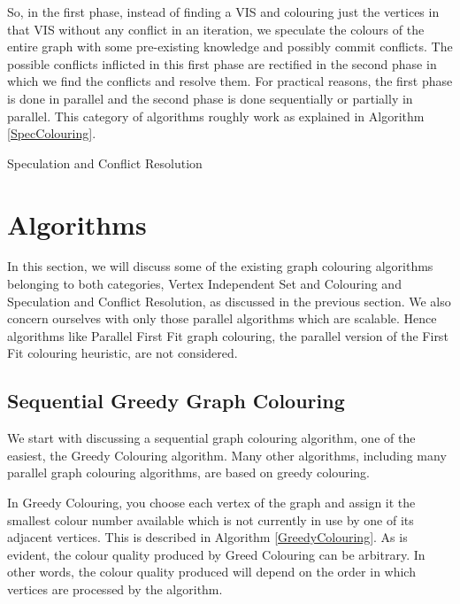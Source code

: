 \documentclass[MTech]{iitmdiss}
\makeatletter
\def\BState{\State\hskip-\ALG@thistlm}
\makeatother
\begin{document}
So, in the first phase, instead of finding a VIS and colouring just the vertices in that VIS without any conflict in an iteration, we speculate the colours of the entire graph with some pre-existing knowledge and possibly commit conflicts. The possible conflicts inflicted in this first phase are rectified in the second phase in which we find the conflicts and resolve them. For practical reasons, the first phase is done in parallel and the second phase is done sequentially or partially in parallel. This category of algorithms roughly work as explained in Algorithm \ref{SpecColouring}.

\begin{algorithm}
\caption{Speculation and Conflict Resolution}\label{SpecColouring}
\end{algorithm}
\section{Algorithms}
In this section, we will discuss some of the existing graph colouring algorithms belonging to both categories, Vertex Independent Set and Colouring and Speculation and Conflict Resolution, as discussed in the previous section. We also concern ourselves with only those parallel algorithms which are scalable. Hence algorithms like Parallel First Fit graph colouring, the parallel version of the First Fit colouring heuristic, are not considered. 
\subsection{Sequential Greedy Graph Colouring}
We start with discussing a sequential graph colouring algorithm, one of the easiest, the Greedy Colouring algorithm. Many other algorithms, including many parallel graph colouring algorithms, are based on greedy colouring.

In Greedy Colouring, you choose each vertex of the graph and assign it the smallest colour number available which is not currently in use by one of its adjacent vertices. This is described in Algorithm \ref{GreedyColouring}. As is evident, the colour quality produced by Greed Colouring can be arbitrary. In other words, the colour quality produced will depend on the order in which vertices are processed by the algorithm.
\end{document}
